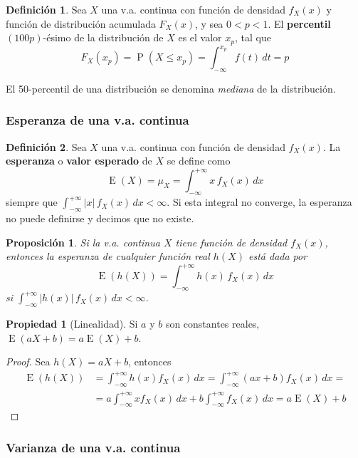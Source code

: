 \documentclass[11pt]{article}
\theoremstyle{plain}
\newtheorem*{pro}{Proposición}
\theoremstyle{definition}
\newtheorem*{defi}{Definición}
\newtheorem*{prop}{Propiedad}
\theoremstyle{remark}
\newcommand{\deft}[1]{\textbf{#1}}  %
\newcommand{\proba}{\ensuremath{\operatorname{P}}}  %
\newcommand{\esp}[0]{\ensuremath{\operatorname{E}}}  %
\begin{document}
    \begin{defi}
      Sea $X$ una v.a. continua con función de densidad $f_X(x)$ y función de distribución acumulada $F_X(x)$, y sea $0 < p < 1$. El \deft{percentil} $(100p)$-ésimo de la distribución de $X$ es el valor $x_p$, tal que
      \[ F_X(x_p) = \proba(X \leq x_p) = \int_{-\infty}^{x_p} f(t) \,dt = p \]

      El 50-percentil de una distribución se denomina \emph{mediana} de la distribución.
    \end{defi}

    \subsubsection{Esperanza de una v.a. continua}

      \begin{defi}
        Sea $X$ una v.a. continua con función de densidad $f_X(x)$. La \deft{esperanza} o \deft{valor esperado} de $X$ se define como
        \[ \esp(X) = \mu_X = \int_{-\infty}^{+\infty} x \, f_X(x) \,dx \]
        siempre que $\int_{-\infty}^{+\infty} |x| \, f_X(x) \,dx < \infty$. Si esta integral no converge, la esperanza no puede definirse y decimos que no existe.
      \end{defi}

      \begin{pro}
        Si la v.a. continua $X$ tiene función de densidad $f_X(x)$, entonces la esperanza de cualquier función real $h(X)$ está dada por
        \[ \esp(h(X)) = \int_{-\infty}^{+\infty} h(x) \, f_X(x) \,dx \]
        si $\int_{-\infty}^{+\infty} |h(x)| \, f_X(x) \,dx < \infty$.
      \end{pro}

      \begin{prop} [Linealidad]
        Si $a$ y $b$ son constantes reales, $\esp(aX + b) = a\esp(X) + b$.
      \end{prop}
      \begin{proof}
        Sea $h(X) = aX + b$, entonces
        \[ \begin{split} 
        \esp(h(X)) &= \int_{-\infty}^{+\infty} h(x) f_X(x) \,dx = \int_{-\infty}^{+\infty} (ax + b) f_X(x) \,dx = \\
        &= a \int_{-\infty}^{+\infty} x f_X(x) \,dx + b \int_{-\infty}^{+\infty} f_X(x) \,dx = a \esp(X) + b
        \end{split} \]
      \end{proof}

    \subsubsection{Varianza de una v.a. continua}
\end{document}
